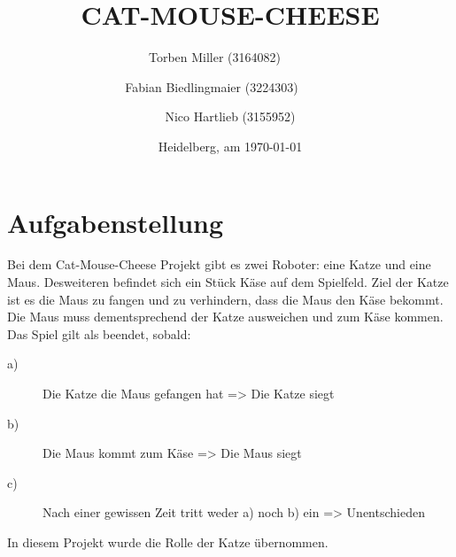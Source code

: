 \documentclass[
a4paper,     %
12pt         %
]{scrartcl}  %
\title{CAT-MOUSE-CHEESE}
\author{Torben Miller (3164082)\ \ \ \ \ \and
Fabian Biedlingmaier (3224303)\ \ \ \ \ \ \and
Nico Hartlieb (3155952)}
\date{Heidelberg, am \today{}}
\begin{document}

 \maketitle

 \newpage
 \tableofcontents

 \newpage
 \listoffigures


 \newpage



\section{Aufgabenstellung}
Bei dem \glqq Cat-Mouse-Cheese\grqq{} Projekt gibt es zwei Roboter: eine Katze und eine Maus. Desweiteren befindet sich ein Stück Käse auf dem Spielfeld.
Ziel der Katze ist es die Maus zu fangen und zu verhindern, dass die Maus den Käse bekommt.
Die Maus muss dementsprechend der Katze ausweichen und zum Käse kommen.
Das Spiel gilt als beendet, sobald:
\begin{description}
\item[a)]Die Katze die Maus gefangen hat => Die Katze siegt
\item[b)] Die Maus kommt zum Käse => Die Maus siegt
\item[c)] Nach einer gewissen Zeit tritt weder a) noch b) ein => Unentschieden
\end{description}
In diesem Projekt wurde die Rolle der Katze übernommen.
\end{document}
